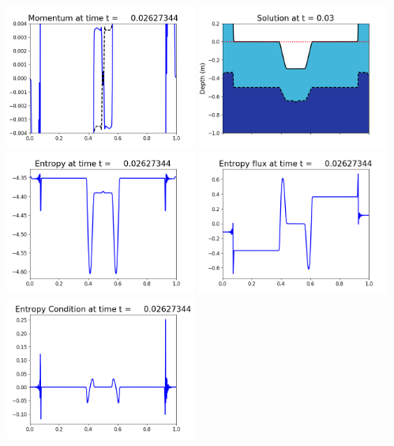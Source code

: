 \documentclass[11pt]{article}
\begin{document}
\vskip 10pt 
\includegraphics[width=0.475\textwidth]{frame0061fig1003.png}
\includegraphics[width=0.475\textwidth]{frame0061fig1006.png}
\vskip 10pt 
\includegraphics[width=0.475\textwidth]{frame0061fig1007.png}
\includegraphics[width=0.475\textwidth]{frame0061fig1008.png}
\vskip 10pt 
\includegraphics[width=0.475\textwidth]{frame0061fig1009.png}
\end{document}
